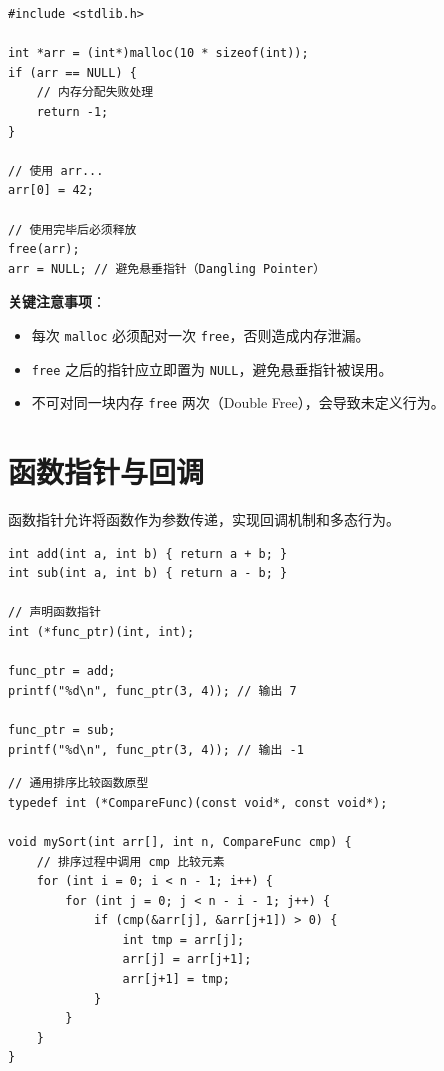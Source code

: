 \begin{lstlisting}[caption={动态内存管理示例}]
#include <stdlib.h>

int *arr = (int*)malloc(10 * sizeof(int));
if (arr == NULL) {
    // 内存分配失败处理
    return -1;
}

// 使用 arr...
arr[0] = 42;

// 使用完毕后必须释放
free(arr);
arr = NULL; // 避免悬垂指针（Dangling Pointer）
\end{lstlisting}

\textbf{关键注意事项}：

\begin{itemize}
    \item 每次 \texttt{malloc} 必须配对一次 \texttt{free}，否则造成内存泄漏。
    \item \texttt{free} 之后的指针应立即置为 \texttt{NULL}，避免悬垂指针被误用。
    \item 不可对同一块内存 \texttt{free} 两次（Double Free），会导致未定义行为。
\end{itemize}

\section{函数指针与回调}

函数指针允许将函数作为参数传递，实现回调机制和多态行为。

\begin{lstlisting}[caption={函数指针示例}]
int add(int a, int b) { return a + b; }
int sub(int a, int b) { return a - b; }

// 声明函数指针
int (*func_ptr)(int, int);

func_ptr = add;
printf("%d\n", func_ptr(3, 4)); // 输出 7

func_ptr = sub;
printf("%d\n", func_ptr(3, 4)); // 输出 -1
\end{lstlisting}

\begin{lstlisting}[caption={回调函数示例}]
// 通用排序比较函数原型
typedef int (*CompareFunc)(const void*, const void*);

void mySort(int arr[], int n, CompareFunc cmp) {
    // 排序过程中调用 cmp 比较元素
    for (int i = 0; i < n - 1; i++) {
        for (int j = 0; j < n - i - 1; j++) {
            if (cmp(&arr[j], &arr[j+1]) > 0) {
                int tmp = arr[j];
                arr[j] = arr[j+1];
                arr[j+1] = tmp;
            }
        }
    }
}
\end{lstlisting}

